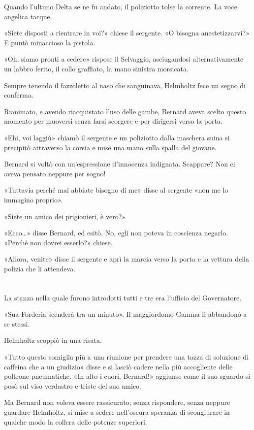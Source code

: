 \documentclass[
a5paper, %
10pt, %
twoside, 
onecolumn, %
openany, %
]{memoir}
\begin{document}
Quando l’ultimo Delta se ne fu andato, il poliziotto tolse la corrente. La voce angelica tacque.

«Siete disposti a rientrare in voi?» chiese il sergente. «O bisogna anestetizzarvi?» E puntò minaccioso la pistola.

«Oh, siamo pronti a cedere» rispose il Selvaggio, asciugandosi alternativamente un labbro ferito, il collo graffiato, la mano sinistra morsicata.

Sempre tenendo il fazzoletto al naso che sanguinava, Helmholtz fece un segno di conferma.

Rianimato, e avendo riacquistato l’uso delle gambe, Bernard aveva scelto questo momento per muoversi senza farsi scorgere e per dirigersi verso la porta.

«Ehi, voi laggiù» chiamò il sergente e un poliziotto dalla maschera suina si precipitò attraverso la corsia e mise una mano sulla spalla del giovane.

Bernard si voltò con un’espressione d’innocenza indignata. Scappare? Non ci aveva pensato neppure per sogno!

«Tuttavia perché mai abbiate bisogno di me» disse al sergente «non me lo immagino proprio».

«Siete un amico dei prigionieri, è vero?»

«Ecco…» disse Bernard, ed esitò. No, egli non poteva in coscienza negarlo. «Perché non dovrei esserlo?» chiese.

«Allora, venite» disse il sergente e aprì la marcia verso la porta e la vettura della polizia che li attendeva.

\chapter{\phantom{title}}

\lettrine{L}{a} stanza nella quale furono introdotti tutti e tre era l’ufficio del Governatore.

«Sua Forderia scenderà tra un minuto». Il maggiordomo Gamma li abbandonò a se stessi.

Helmholtz scoppiò in una risata.

«Tutto questo somiglia più a una riunione per prendere una tazza di soluzione di caffeina che a un giudizio» disse e si lasciò cadere nella più accogliente delle poltrone pneumatiche. «In alto i cuori, Bernard!» aggiunse come il suo sguardo si posò sul viso verdastro e triste del suo amico.

Ma Bernard non voleva essere rassicurato; senza rispondere, senza neppure guardare Helmholtz, si mise a sedere nell’oscura speranza di scongiurare in qualche modo la collera delle potenze superiori.
\end{document}
